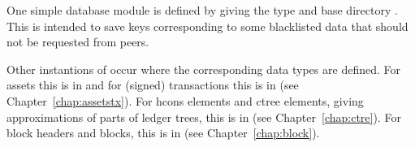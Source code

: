 One simple database module {}
is defined by giving {} the type {} and 
base directory {}.
This is intended to save keys corresponding to some blacklisted data that
should not be requested from peers.

Other instantions of {}
occur where the corresponding data types are defined.
For assets this is in {}
and
for (signed) transactions this is in {}
(see Chapter~\ref{chap:assetstx}).
For hcons elements and ctree elements,
giving approximations of parts of ledger trees,
this is in {}
(see Chapter~\ref{chap:ctre}).
For block headers and blocks,
this is in {}
(see Chapter~\ref{chap:block}).

